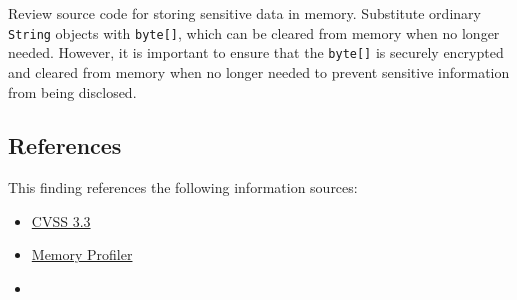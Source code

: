 Review source code for storing sensitive data in memory.
Substitute ordinary \texttt{String} objects with \texttt{byte[]}, which can be cleared from memory when no longer needed.
However, it is important to ensure that the \texttt{byte[]} is securely encrypted and cleared from memory when no longer needed to prevent sensitive information from being disclosed.


\subsection*{References}

This finding references the following information sources:

\begin{itemize}
	\item \href{https://www.first.org/cvss/calculator/3.1#CVSS:3.1/AV:L/AC:L/PR:L/UI:N/S:U/C:L/I:N/A:N}{CVSS 3.3}
    \item \href{https://developer.android.com/studio/profile/memory-profiler}{Memory Profiler}
	\item {}
\end{itemize}



